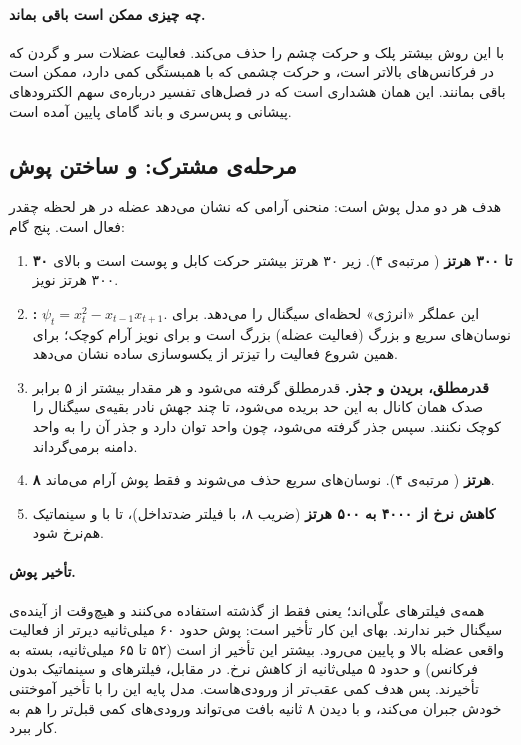 \paragraph{چه چیزی ممکن است باقی بماند.}  با این روش بیشتر پلک و حرکت چشم را حذف می‌کند. فعالیت عضلات سر و گردن که در فرکانس‌های بالاتر است، و حرکت چشمی که با  همبستگی کمی دارد، ممکن است باقی بمانند. این همان هشداری است که در فصل‌های تفسیر درباره‌ی سهم الکترودهای پیشانی و پس‌سری و باند گامای پایین آمده است.

\subsection{مرحله‌ی مشترک:  و ساختن پوش}

هدف هر دو مدل پوش  است: منحنی آرامی که نشان می‌دهد عضله در هر لحظه چقدر فعال است. پنج گام:
\begin{enumerate}
\item \textbf{ ۳۰ تا ۳۰۰ هرتز} ( مرتبه‌ی ۴). زیر ۳۰ هرتز بیشتر  حرکت کابل و پوست است و بالای ۳۰۰ هرتز نویز.
\item \textbf{:} $\psi_t=x_t^2-x_{t-1}x_{t+1}$. این عملگر «انرژی» لحظه‌ای سیگنال را می‌دهد. برای نوسان‌های سریع و بزرگ (فعالیت عضله) بزرگ است و برای نویز آرام کوچک؛ برای همین شروع فعالیت را تیزتر از یکسوسازی ساده نشان می‌دهد.
\item \textbf{قدرمطلق، بریدن و جذر.} قدرمطلق گرفته می‌شود و هر مقدار بیشتر از ۵ برابر صدک  همان کانال به این حد بریده می‌شود، تا چند جهش نادر بقیه‌ی سیگنال را کوچک نکنند. سپس جذر گرفته می‌شود، چون  واحد توان دارد و جذر آن را به واحد دامنه برمی‌گرداند.
\item \textbf{ ۸ هرتز} ( مرتبه‌ی ۴). نوسان‌های سریع حذف می‌شوند و فقط پوش آرام می‌ماند.
\item \textbf{کاهش نرخ از ۴۰۰۰ به ۵۰۰ هرتز} (ضریب ۸، با فیلتر ضدتداخل)، تا با  و سینماتیک هم‌نرخ شود.
\end{enumerate}

\paragraph{تأخیر پوش.} همه‌ی فیلترهای  علّی‌اند؛ یعنی فقط از گذشته استفاده می‌کنند و هیچ‌وقت از آینده‌ی سیگنال خبر ندارند. بهای این کار تأخیر است: پوش حدود ۶۰ میلی‌ثانیه دیرتر از فعالیت واقعی عضله بالا و پایین می‌رود. بیشتر این تأخیر از  است (۵۲ تا ۶۵ میلی‌ثانیه، بسته به فرکانس) و حدود ۵ میلی‌ثانیه از کاهش نرخ. در مقابل، فیلترهای  و سینماتیک بدون تأخیرند. پس هدف کمی عقب‌تر از ورودی‌هاست. مدل پایه این را با تأخیر آموختنی خودش جبران می‌کند، و  با دیدن ۸ ثانیه بافت می‌تواند ورودی‌های کمی قبل‌تر را هم به کار ببرد.

